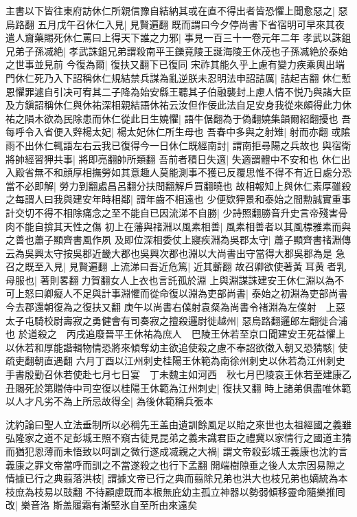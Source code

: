 主書以下皆往東府訪休仁所親信豫自結納其或在直不得出者皆恐懼上聞愈惡之|{
	惡烏路翻}
五月戊午召休仁入見|{
	見賢遍翻}
既而謂曰今夕停尚書下省宿明可早來其夜遣人齎藥賜死休仁罵曰上得天下誰之力邪|{
	事見一百三十一卷元年二年}
孝武以誅鉏兄弟子孫㓕絶|{
	孝武誅鉏兄弟謂殺南平王鑠竟陵王誕海陵王休茂也子孫㓕絶於泰始之世事並見前}
今復為爾|{
	復扶又翻下已復同}
宋祚其能久乎上慮有變力疾乘輿出端門休仁死乃入下詔稱休仁規結禁兵謀為亂逆朕未忍明法申詔詰厲|{
	詰起吉翻}
休仁慙恩懼罪遽自引决可宥其二子降為始安縣王聽其子伯融襲封上慮人情不悦乃與諸大臣及方鎭詔稱休仁與休祐深相親結語休祐云汝但作佞此法自足安身我從來頗得此力休祐之隕木欲為民除患而休仁從此日生嬈懼|{
	語牛倨翻為于偽翻嬈集韻爾紹翻擾也}
吾每呼令入省便入辤楊太妃|{
	楊太妃休仁所生母也}
吾春中多與之射雉|{
	射而亦翻}
或隂雨不出休仁輒語左右云我已復得今一日休仁既經南討|{
	謂南拒尋陽之兵故也}
與宿衛將帥經習狎共事|{
	將即亮翻帥所類翻}
吾前者積日失適|{
	失適謂體中不安和也}
休仁出入殿省無不和顔厚相撫勞如其意趣人莫能測事不獲已反覆思惟不得不有近日處分恐當不必即解|{
	勞力到翻處昌呂翻分扶問翻解戶買翻曉也}
故相報知上與休仁素厚雖殺之每謂人曰我與建安年時相鄰|{
	謂年齒不相遠也}
少便欵狎景和泰始之間勲誠實重事計交切不得不相除痛念之至不能自已因流涕不自勝|{
	少詩照翻勝音升史言帝殘害骨肉不能自揜其天性之傷}
初上在藩與禇淵以風素相善|{
	風素相善者以其風標雅素而與之善也蕭子顯齊書風作夙}
及即位深相委仗上寢疾淵為吳郡太守|{
	蕭子顯齊書禇淵傳云為吳興太守按吳郡近畿大郡也吳興次郡也淵以大尚書出守當得大郡吳郡為是}
急召之既至入見|{
	見賢遍翻}
上流涕曰吾近危篤|{
	近其蘄翻}
故召卿欲使著黃耳黄者乳母服也|{
	著則畧翻力賀翻女人上衣也言託孤於淵}
上與淵謀誅建安王休仁淵以為不可上怒曰卿癡人不足與計事淵懼而從命復以淵為吏部尚書|{
	泰始之初淵為吏部尚書今去郡還朝復為之復扶又翻}
庚午以尚書右僕射袁粲為尚書令禇淵為左僕射　上惡太子屯騎校尉壽寂之勇健會有司奏寂之擅殺邏尉徙越州|{
	惡烏路翻邏郎左翻徙合浦也}
於道殺之　丙戌追廢晉平王休祐為庶人　巴陵王休若至京口聞建安王死益懼上以休若和厚能諧輯物情恐將來傾奪幼主欲追使殺之慮不奉詔欲徵入朝又恐猜駭|{
	使疏吏翻朝直遇翻}
六月丁酉以江州刺史桂陽王休範為南徐州刺史以休若為江州刺史手書殷勤召休若使赴七月七日宴　丁未魏主如河西　秋七月巴陵哀王休若至建康乙丑賜死於第贈侍中司空復以桂陽王休範為江州刺史|{
	復扶又翻}
時上諸弟俱盡唯休範以人才凡劣不為上所忌故得全|{
	為後休範稱兵張本}


沈約論曰聖人立法垂制所以必稱先王盖由遺訓餘風足以貽之來世也太祖經國之義雖弘隆家之道不足彭城王照不窺古徒見昆弟之義未識君臣之禮冀以家情行之國道主猜而猶犯恩薄而未悟致以呵訓之微行遂成㓕親之大禍|{
	謂文帝殺彭城王義康也沈約言義康之罪文帝當呼而訓之不當遂殺之也行下孟翻}
開端樹隙垂之後人太宗因易隙之情據已行之典翦落洪枝|{
	謂據文帝已行之典而翦除兄弟也洪大也枝兄弟也嫡統為本枝庶為枝易以豉翻}
不待顧慮既而本根無庇幼主孤立神器以勢弱傾移靈命隨樂推囘改|{
	樂音洛}
斯盖履霜有漸堅氷自至所由來遠矣

